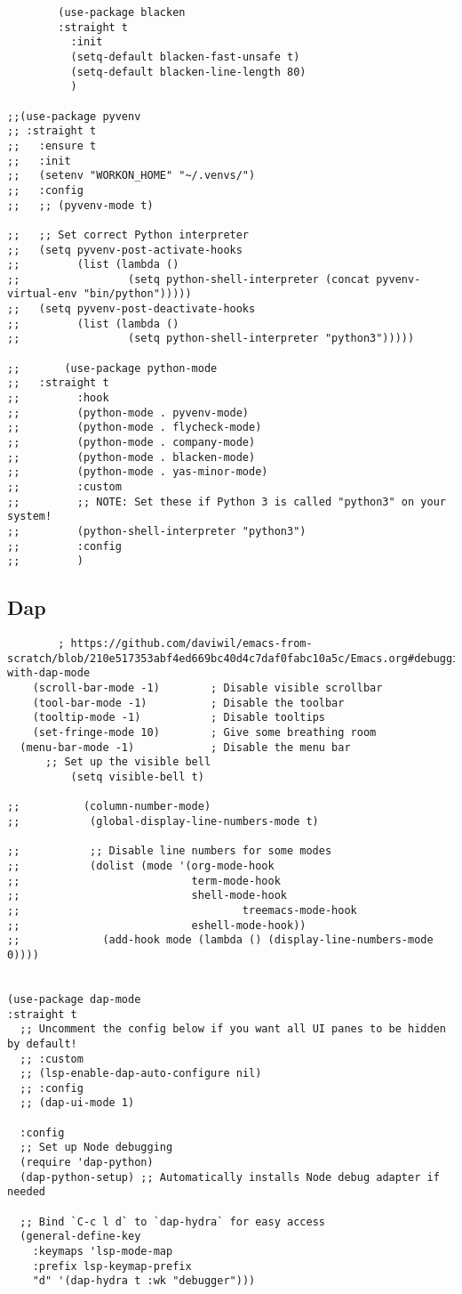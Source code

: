 \documentclass[11pt]{article}
\begin{document}
\begin{verbatim}
        (use-package blacken
        :straight t
          :init
          (setq-default blacken-fast-unsafe t)
          (setq-default blacken-line-length 80)
          )

;;(use-package pyvenv
;; :straight t
;;   :ensure t
;;   :init
;;   (setenv "WORKON_HOME" "~/.venvs/")
;;   :config
;;   ;; (pyvenv-mode t)

;;   ;; Set correct Python interpreter
;;   (setq pyvenv-post-activate-hooks
;;         (list (lambda ()
;;                 (setq python-shell-interpreter (concat pyvenv-virtual-env "bin/python")))))
;;   (setq pyvenv-post-deactivate-hooks
;;         (list (lambda ()
;;                 (setq python-shell-interpreter "python3")))))

;;       (use-package python-mode
;;   :straight t
;;         :hook
;;         (python-mode . pyvenv-mode)
;;         (python-mode . flycheck-mode)
;;         (python-mode . company-mode)
;;         (python-mode . blacken-mode)
;;         (python-mode . yas-minor-mode)
;;         :custom
;;         ;; NOTE: Set these if Python 3 is called "python3" on your system!
;;         (python-shell-interpreter "python3")
;;         :config
;;         )
\end{verbatim}
\subsection{Dap}
\label{sec:org424caba}
\begin{verbatim}
        ; https://github.com/daviwil/emacs-from-scratch/blob/210e517353abf4ed669bc40d4c7daf0fabc10a5c/Emacs.org#debugging-with-dap-mode
    (scroll-bar-mode -1)        ; Disable visible scrollbar
    (tool-bar-mode -1)          ; Disable the toolbar
    (tooltip-mode -1)           ; Disable tooltips
    (set-fringe-mode 10)        ; Give some breathing room
  (menu-bar-mode -1)            ; Disable the menu bar
      ;; Set up the visible bell
          (setq visible-bell t)

;;          (column-number-mode)
;;           (global-display-line-numbers-mode t)

;;           ;; Disable line numbers for some modes
;;           (dolist (mode '(org-mode-hook
;;                           term-mode-hook
;;                           shell-mode-hook
;;                                   treemacs-mode-hook
;;                           eshell-mode-hook))
;;             (add-hook mode (lambda () (display-line-numbers-mode 0))))


(use-package dap-mode
:straight t
  ;; Uncomment the config below if you want all UI panes to be hidden by default!
  ;; :custom
  ;; (lsp-enable-dap-auto-configure nil)
  ;; :config
  ;; (dap-ui-mode 1)

  :config
  ;; Set up Node debugging
  (require 'dap-python)
  (dap-python-setup) ;; Automatically installs Node debug adapter if needed

  ;; Bind `C-c l d` to `dap-hydra` for easy access
  (general-define-key
    :keymaps 'lsp-mode-map
    :prefix lsp-keymap-prefix
    "d" '(dap-hydra t :wk "debugger")))

\end{verbatim}
\end{document}
